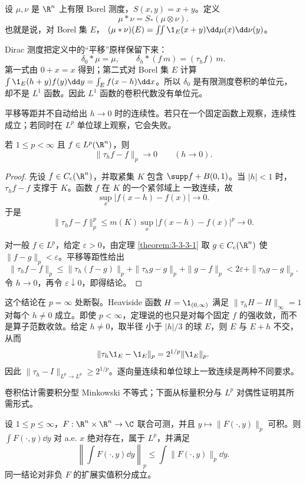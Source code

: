 \begin{definition}[测度卷积]\label{def:4-4-1-3}
设 $\mu,\nu$ 是 $\R^n$ 上有限 Borel 测度，$S(x,y)=x+y$。定义
\[
 \mu*\nu=S_*(\mu\otimes\nu).
\]
也就是说，对 Borel 集 $E$，
$ (\mu*\nu)(E)=\iint\1_E(x+y)\dd\mu(x)\dd\nu(y)$。
\end{definition}

\begin{example}\label{ex:4-4-1-2}
Dirac 测度把定义中的“平移”原样保留下来：
\[
 \delta_0*\mu=\mu,\qquad \delta_h*(f\,m)=(\tau_hf)\,m.
\]
第一式由 $0+x=x$ 得到；第二式对 Borel 集 $E$ 计算
$\int\1_E(h+y)f(y)\dd y=\int_Ef(x-h)\dd x$。所以 $\delta_0$ 是有限测度卷积的单位元，
却不是 $L^1$ 函数。因此 $L^1$ 函数的卷积代数没有单位元。
\end{example}

平移等距并不自动给出 $h\to0$ 时的连续性。若只在一个固定函数上观察，连续性成立；若同时在
$L^p$ 单位球上观察，它会失败。

\begin{theorem}[$L^p$ 平移连续]\label{theorem:4-4-1-1}
若 $1\le p<\infty$ 且 $f\in L^p(\R^n)$，则
\[
 \|\tau_hf-f\|_p\longrightarrow0\qquad(h\to0).
\]
\end{theorem}

\begin{proof}
先设 $f\in C_c(\R^n)$，并取紧集 $K$ 包含
$\supp f+B(0,1)$。当 $|h|<1$ 时，$\tau_hf-f$ 支撑于 $K$。函数 $f$ 在 $K$ 的一个紧邻域上
一致连续，故
\[
 \sup_x|f(x-h)-f(x)|\longrightarrow0.
\]
于是
\[
 \|\tau_hf-f\|_p^p
 \le m(K)\sup_x|f(x-h)-f(x)|^p\longrightarrow0.
\]

对一般 $f\in L^p$，给定 $\varepsilon>0$，由定理
\ref{theorem:3-3-3-1} 取 $g\in C_c(\R^n)$ 使 $\|f-g\|_p<\varepsilon$。平移等距性给出
\[
 \|\tau_hf-f\|_p
 \le \|\tau_h(f-g)\|_p+\|\tau_hg-g\|_p+\|g-f\|_p
 <2\varepsilon+\|\tau_hg-g\|_p.
\]
令 $h\to0$，再令 $\varepsilon\downarrow0$，即得结论。
\end{proof}

这个结论在 $p=\infty$ 处断裂。Heaviside 函数
$H=\1_{(0,\infty)}$ 满足 $\|\tau_hH-H\|_\infty=1$ 对每个 $h\ne0$ 成立。即使
$p<\infty$，定理说的也只是对每个固定 $f$ 的强收敛，而不是算子范数收敛。给定 $h\ne0$，取半径
小于 $|h|/3$ 的球 $E$，则 $E$ 与 $E+h$ 不交，从而
\[
 \|\tau_h\1_E-\1_E\|_p=2^{1/p}\|\1_E\|_p.
\]
因此 $\|\tau_h-I\|_{L^p\to L^p}\ge2^{1/p}$。逐向量连续和单位球上一致连续是两种不同要求。

卷积估计需要积分型 Minkowski 不等式；下面从标量积分与 $L^p$ 对偶性证明其所需形式。

\begin{lemma}\label{lemma:4-4-1-minkowski-integral}
设 $1\le p\le\infty$，$F:\R^n\times\R^n\to\C$ 联合可测，并且
$y\mapsto\|F(\cdot,y)\|_p$ 可积。则 $\int F(\cdot,y)\dd y$ 对 a.e. $x$ 绝对存在，属于
$L^p$，并满足
\[
 \left\|\int F(\cdot,y)\dd y\right\|_p
 \le\int\|F(\cdot,y)\|_p\dd y.
\]
同一结论对非负 $F$ 的扩展实值积分成立。
\end{lemma}

